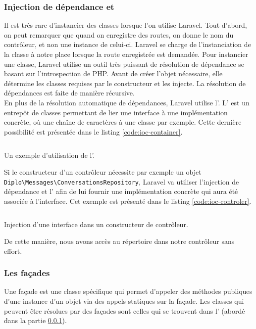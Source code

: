 		\subsubsection{Injection de dépendance et \ioc{}}
		\label{subsubsec:ioc}
			Il est très rare d'instancier des classes lorsque l'on utilise Laravel. Tout d'abord, on peut remarquer que quand on enregistre des routes, on donne le nom du contrôleur, et non une instance de celui-ci. Laravel se charge de l'instanciation de la classe à notre place lorsque la route enregistrée est demandée. Pour instancier une classe, Laravel utilise un outil très puissant de résolution de dépendance se basant sur l'introspection de PHP. Avant de créer l'objet nécessaire, elle détermine les classes requises par le constructeur et les injecte. La résolution de dépendances est faite de manière récursive.\\

			En plus de la résolution automatique de dépendances, Laravel utilise l'\ioc{}. L'\ioc{} est un entrepôt de classes permettant de lier une interface à une implémentation concrète, où une chaîne de caractères à une classe par exemple. Cette dernière possibilité est présentée dans le listing \ref{code:ioc-container}.

			\begin{listing}[H]
				\inputminted[fontsize=\scriptsize]{php}{code/iocContainer.php}
				\caption{Un exemple d'utilisation de l'\ioc{}.}
				\label{code:ioc-container}
			\end{listing}

			Si le constructeur d'un contrôleur nécessite par exemple un objet \verb|Diplo\Messages\ConversationsRepository|, Laravel va utiliser l'injection de dépendance et l'\ioc{} afin de lui fournir une implémentation concrète qui aura été associée à l'interface. Cet exemple est présenté dans le listing \ref{code:ioc-controler}.
			\begin{listing}[H]
				\inputminted[fontsize=\scriptsize]{php}{code/injectionClass.php}
				\caption{Injection d'une interface dans un constructeur de contrôleur.}
				\label{code:ioc-controler}
			\end{listing}

			De cette manière, nous avons accès au répertoire dans notre contrôleur sans effort.

		\subsubsection{Les façades}
			Une façade est une classe spécifique qui permet d'appeler des méthodes publiques d'une instance d'un objet via des appels statiques sur la façade. Les classes qui peuvent être résolues par des façades sont celles qui se trouvent dans l'\ioc{} (abordé dans la partie \ref{subsubsec:ioc}).\\

